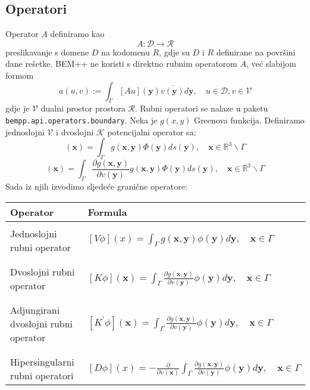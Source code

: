 \documentclass[a4paper,twoside,12pt]{memoir} %
\begin{document}
\subsection{Operatori}
Operator $A$ definiramo kao $$A:\mathcal{D} \rightarrow \mathcal{R}$$ preslikavanje s domene $D$ na kodomenu $R$, gdje su $D$ i $R$ definirane na površini dane rešetke. BEM++ ne koristi s direktno rubnim operatorom $A$, već slabijom formom 
\begin{equation}
a(u,v):=\int_\Gamma[Au](\mathbf{y})\overline{v(\mathbf{y})}d\mathbf{y},\quad u\in \mathcal{D}, v\in \mathcal{V}
\end{equation}  
gdje je $\mathcal{V}$ dualni prostor prostora $\mathcal{R}$. Rubni operatori se nalaze u paketu \newline \texttt{bempp.api.operators.boundary}. Neka je $g(x,y)$ Greenova funkcija. Definiramo jednoslojni $\mathcal{V}$ i dvoslojni $\mathcal{K}$ potencijalni operator sa:
\begin{equation}
[\mathcal{V}\Phi](\mathbf{x})=\int_\Gamma g(\mathbf{x},\mathbf{y})\Phi(\mathbf{y})ds(\mathbf{y}), \quad \mathbf{x}\in \mathbb{R}^{3}\backslash \Gamma
\end{equation}
\begin{equation}
[\mathcal{K}\Phi](\mathbf{x})=\int_\Gamma \frac{\partial g(\mathbf{x},\mathbf{y})}{\partial v(\mathbf{y})}g(\mathbf{x},\mathbf{y})\Phi(\mathbf{y})ds(\mathbf{y}), \quad \mathbf{x}\in \mathbb{R}^{3}\backslash \Gamma
\end{equation}
Sada iz njih izvodimo sljedeće granične operatore:

\begin{table}[H]
\begin{tabular}{m{7cm} m{7cm}}
\large{Operator} & \large{Formula} \\ \hline \\
 Jednoslojni rubni operator & $[V\phi](x)=\int_\Gamma g(\mathbf{x},\mathbf{y})\phi(\mathbf{y})d\mathbf{y},\quad \mathbf{x}\in \Gamma$ \\ \\ \hline \\
Dvoslojni rubni operator & $[K\phi](\mathbf{x})=\int_\Gamma\frac{\partial g(\mathbf{x},\mathbf{y})}{\partial v(\mathbf{y})}\phi(\mathbf{y})d\mathbf{y}, \quad \mathbf{x}\in \Gamma$ \\\\ \hline \\
Adjungirani dvoslojni rubni operator & $[K^{'}\phi](\mathbf{x})=\int_\Gamma\frac{\partial g(\mathbf{x},\mathbf{y})}{\partial v(\mathbf{y})}\phi(\mathbf{y})d\mathbf{y}, \quad \mathbf{x}\in \Gamma$ \\\\ \hline \\
 Hipersingularni rubni operatori& $[D\phi](x)=-\frac{\partial}{\partial v(\mathbf{x})}\int_\Gamma \frac{\partial g(\mathbf{x},\mathbf{y})}{\partial v(\mathbf{y})}\phi(\mathbf{y})d\mathbf{y}, \quad \mathbf{x} \in \Gamma$
\end{tabular}
\end{table}
\end{document}
